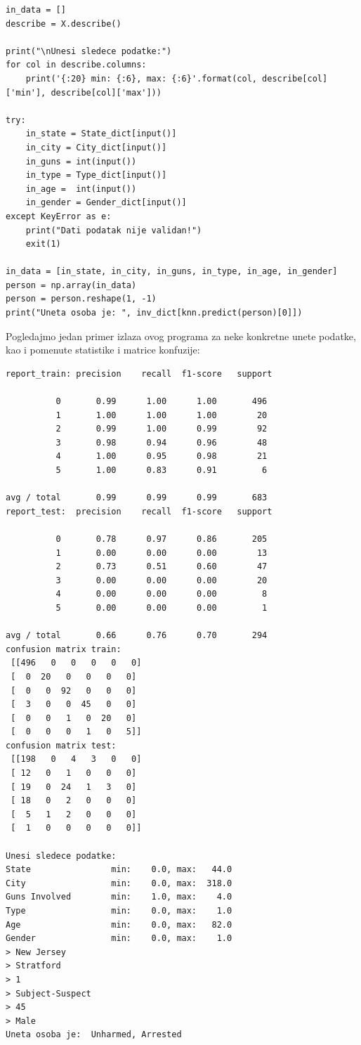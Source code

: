 \documentclass[12pt, a4paper]{article}
\begin{document}
\begin{lstlisting}
in_data = []
describe = X.describe()

print("\nUnesi sledece podatke:")
for col in describe.columns:
    print('{:20} min: {:6}, max: {:6}'.format(col, describe[col]['min'], describe[col]['max']))

try:
    in_state = State_dict[input()]
    in_city = City_dict[input()]
    in_guns = int(input())
    in_type = Type_dict[input()]
    in_age =  int(input())
    in_gender = Gender_dict[input()]
except KeyError as e:
    print("Dati podatak nije validan!")
    exit(1)

in_data = [in_state, in_city, in_guns, in_type, in_age, in_gender]
person = np.array(in_data)
person = person.reshape(1, -1)
print("Uneta osoba je: ", inv_dict[knn.predict(person)[0]])
\end{lstlisting}
Pogledajmo jedan primer izlaza ovog programa za neke konkretne unete podatke, kao i pomenute statistike i matrice konfuzije:

\newpage
\begin{verbatim}
report_train: precision    recall  f1-score   support

          0       0.99      1.00      1.00       496
          1       1.00      1.00      1.00        20
          2       0.99      1.00      0.99        92
          3       0.98      0.94      0.96        48
          4       1.00      0.95      0.98        21
          5       1.00      0.83      0.91         6

avg / total       0.99      0.99      0.99       683
report_test:  precision    recall  f1-score   support

          0       0.78      0.97      0.86       205
          1       0.00      0.00      0.00        13
          2       0.73      0.51      0.60        47
          3       0.00      0.00      0.00        20
          4       0.00      0.00      0.00         8
          5       0.00      0.00      0.00         1

avg / total       0.66      0.76      0.70       294
confusion matrix train:
 [[496   0   0   0   0   0]
 [  0  20   0   0   0   0]
 [  0   0  92   0   0   0]
 [  3   0   0  45   0   0]
 [  0   0   1   0  20   0]
 [  0   0   0   1   0   5]]
confusion matrix test:
 [[198   0   4   3   0   0]
 [ 12   0   1   0   0   0]
 [ 19   0  24   1   3   0]
 [ 18   0   2   0   0   0]
 [  5   1   2   0   0   0]
 [  1   0   0   0   0   0]]

Unesi sledece podatke:
State                min:    0.0, max:   44.0
City                 min:    0.0, max:  318.0
Guns Involved        min:    1.0, max:    4.0
Type                 min:    0.0, max:    1.0
Age                  min:    0.0, max:   82.0
Gender               min:    0.0, max:    1.0
> New Jersey
> Stratford
> 1
> Subject-Suspect
> 45
> Male
Uneta osoba je:  Unharmed, Arrested
\end{verbatim}

\newpage
\listoffigures
\listoftables
\end{document}
